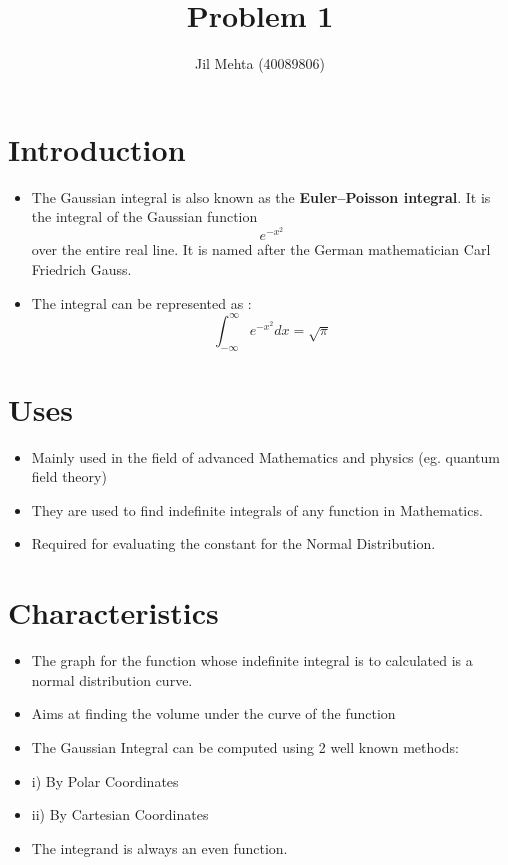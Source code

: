 \documentclass{article}
\title{Problem 1}
\author{Jil Mehta (40089806) }
\begin{document}
\maketitle

\section{Introduction}
\begin{itemize}
    \item 
    The Gaussian integral is  also known as the \textbf{Euler–Poisson integral}. It is the integral of the Gaussian function  \begin{equation} e^{-x^2} \end{equation} over the entire real line. It is named after the German mathematician Carl Friedrich Gauss.
\item
The integral can be represented as :\begin{equation} \int_{-\infty}^{\infty} e^{-x^2}dx = \sqrt{\pi}  \end{equation}
\end{itemize}


\section{Uses}
\begin{itemize}
    \item 
    Mainly used in the field of advanced Mathematics and physics (eg. quantum field theory)
\item
They are used to find indefinite integrals of any function in Mathematics.
\item
Required for evaluating the constant for the Normal Distribution.
\end{itemize}

\section{Characteristics}
\begin{itemize}
\item 
The graph for the function whose indefinite integral is to calculated is a normal distribution curve.
\item
Aims at finding the volume under the curve of the function
\item
The Gaussian Integral can be computed using 2 well known methods:
\item[]i) By Polar Coordinates
\item[]ii) By Cartesian Coordinates
\item
The integrand is always an even function.
\end{itemize}
\end{document}
